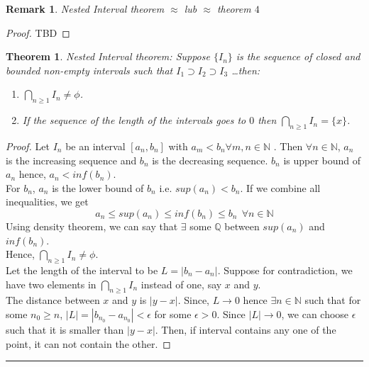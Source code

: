 \documentclass[12pt]{report}
\newtheorem{thm}{Theorem}
\newtheorem*{rem}{Remark}
\begin{document}
\begin{rem}
    Nested Interval theorem $\approx$ lub $\approx$ theorem $4$
\end{rem}
\begin{proof}
    TBD
\end{proof}
\begin{thm}
    Nested Interval theorem: Suppose $\{I_n\}$ is the sequence of closed and bounded non-empty intervals such that $I_1 \supset I_2 \supset I_3$ \dots then:
    \begin{enumerate}
        \item $\bigcap\limits_{n \geq 1} I_n \neq \phi$.
        \item If the sequence of the length of the intervals goes to $0$ then $\bigcap\limits_{n \geq 1} I_n = \{x\}$. 
    \end{enumerate}
\end{thm}

\begin{proof}
    Let $I_n$ be an interval $[a_n, b_n]$ with $a_m < b_n \forall m,n \in \mathbb{N}$ . Then $\forall n \in \mathbb{N}$, $a_n$ is the increasing sequence and $b_n$ is the decreasing sequence. $b_n$ is upper bound of $a_n$ hence, $a_n < inf(b_n)$.\\
    For $b_n$, $a_n$ is the lower bound of $b_n$ i.e. $sup(a_n)< b_n$. If we combine all inequalities, we get 
    $$ a_n \leq sup(a_n) \leq inf(b_n) \leq b_n ~~ \forall n \in \mathbb{N}$$
    Using density theorem, we can say that $\exists$ some $\mathbb{Q}$ between $sup(a_n)$ and $inf(b_n)$.\\
    Hence, $\bigcap\limits_{n \geq 1} I_n \neq \phi$.\\
    Let the length of the interval to be $L = |b_n - a_n|$. Suppose for contradiction, we have two elements in $\bigcap\limits_{n\geq 1}I_n$ instead of one, say $x$ and $y$. \\ The distance between $x$ and $y$ is $|y - x|$. Since, $L \to 0$ hence $\exists n \in \mathbb{N}$ such that for some $n_0 \geq n$, $|L| = |b_{n_0} - a_{n_0}|< \epsilon$ for some $\epsilon > 0$. Since $|L| \to 0$, we can choose $\epsilon$ such that it is smaller than $|y - x|$. Then, if interval contains any one of the point, it can not contain the other.
\end{proof}

\hrule
\end{document}
